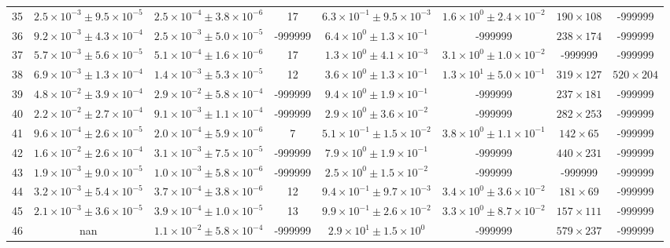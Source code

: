 \begin{table}
\begin{tabular}{cccccccc}
35 & $2.5\times10^{-3}\pm 9.5\times10^{-5}$ & $2.5\times10^{-4}\pm 3.8\times10^{-6}$ & 17 & $6.3\times10^{-1}\pm 9.5\times10^{-3}$ & $1.6\times10^{0}\pm 2.4\times10^{-2}$ & $190\times 108$ & -999999 \\
36 & $9.2\times10^{-3}\pm 4.3\times10^{-4}$ & $2.5\times10^{-3}\pm 5.0\times10^{-5}$ & -999999 & $6.4\times10^{0}\pm 1.3\times10^{-1}$ & -999999 & $238\times 174$ & -999999 \\
37 & $5.7\times10^{-3}\pm 5.6\times10^{-5}$ & $5.1\times10^{-4}\pm 1.6\times10^{-6}$ & 17 & $1.3\times10^{0}\pm 4.1\times10^{-3}$ & $3.1\times10^{0}\pm 1.0\times10^{-2}$ & -999999 & -999999 \\
38 & $6.9\times10^{-3}\pm 1.3\times10^{-4}$ & $1.4\times10^{-3}\pm 5.3\times10^{-5}$ & 12 & $3.6\times10^{0}\pm 1.3\times10^{-1}$ & $1.3\times10^{1}\pm 5.0\times10^{-1}$ & $319\times 127$ & $520\times 204$ \\
39 & $4.8\times10^{-2}\pm 3.9\times10^{-4}$ & $2.9\times10^{-2}\pm 5.8\times10^{-4}$ & -999999 & $9.4\times10^{0}\pm 1.9\times10^{-1}$ & -999999 & $237\times 181$ & -999999 \\
40 & $2.2\times10^{-2}\pm 2.7\times10^{-4}$ & $9.1\times10^{-3}\pm 1.1\times10^{-4}$ & -999999 & $2.9\times10^{0}\pm 3.6\times10^{-2}$ & -999999 & $282\times 253$ & -999999 \\
41 & $9.6\times10^{-4}\pm 2.6\times10^{-5}$ & $2.0\times10^{-4}\pm 5.9\times10^{-6}$ & 7 & $5.1\times10^{-1}\pm 1.5\times10^{-2}$ & $3.8\times10^{0}\pm 1.1\times10^{-1}$ & $142\times 65$ & -999999 \\
42 & $1.6\times10^{-2}\pm 2.6\times10^{-4}$ & $3.1\times10^{-3}\pm 7.5\times10^{-5}$ & -999999 & $7.9\times10^{0}\pm 1.9\times10^{-1}$ & -999999 & $440\times 231$ & -999999 \\
43 & $1.9\times10^{-3}\pm 9.0\times10^{-5}$ & $1.0\times10^{-3}\pm 5.8\times10^{-6}$ & -999999 & $2.5\times10^{0}\pm 1.5\times10^{-2}$ & -999999 & -999999 & -999999 \\
44 & $3.2\times10^{-3}\pm 5.4\times10^{-5}$ & $3.7\times10^{-4}\pm 3.8\times10^{-6}$ & 12 & $9.4\times10^{-1}\pm 9.7\times10^{-3}$ & $3.4\times10^{0}\pm 3.6\times10^{-2}$ & $181\times 69$ & -999999 \\
45 & $2.1\times10^{-3}\pm 3.6\times10^{-5}$ & $3.9\times10^{-4}\pm 1.0\times10^{-5}$ & 13 & $9.9\times10^{-1}\pm 2.6\times10^{-2}$ & $3.3\times10^{0}\pm 8.7\times10^{-2}$ & $157\times 111$ & -999999 \\
46 & nan & $1.1\times10^{-2}\pm 5.8\times10^{-4}$ & -999999 & $2.9\times10^{1}\pm 1.5\times10^{0}$ & -999999 & $579\times 237$ & -999999 \\

\end{tabular}
\end{table}
